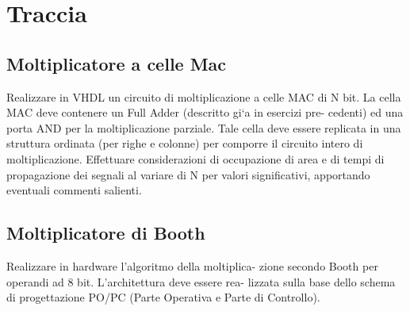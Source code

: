 %

\section{Traccia}

\subsection{Moltiplicatore a celle Mac}

Realizzare in VHDL un circuito di moltiplicazione a celle MAC di N
bit. La cella MAC deve contenere un Full Adder (descritto gi`a in
esercizi pre- cedenti) ed una porta AND per la moltiplicazione parziale.
Tale cella deve essere replicata in una struttura ordinata (per righe
e colonne) per comporre il circuito intero di moltiplicazione. Effettuare
considerazioni di occupazione di area e di tempi di propagazione dei
segnali al variare di N per valori significativi, apportando eventuali
commenti salienti.

\subsection{Moltiplicatore di Booth}

\noindent Realizzare in hardware l\textquoteright algoritmo della
moltiplica- zione secondo Booth per operandi ad 8 bit. L\textquoteright architettura
deve essere rea- lizzata sulla base dello schema di progettazione
PO/PC (Parte Operativa e Parte di Controllo).%

